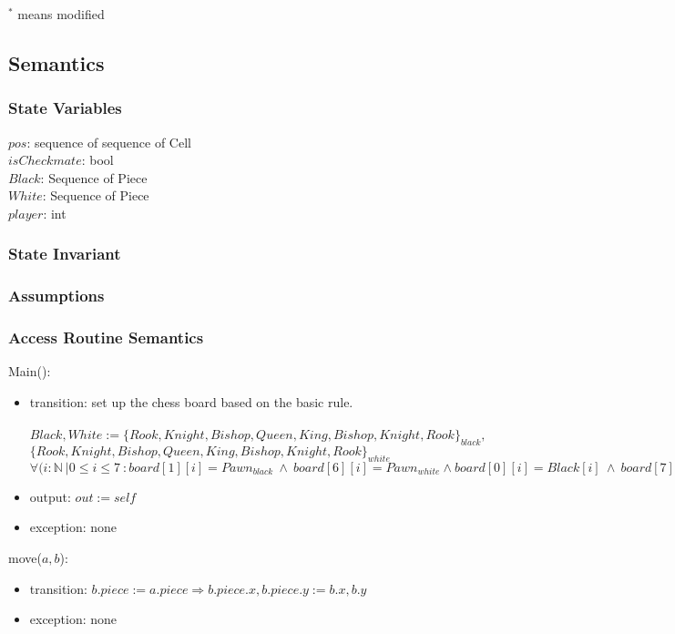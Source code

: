 \documentclass[12pt]{article}
\begin{document}
$^{*}$ means modified

\subsection* {Semantics}

\subsubsection* {State Variables}

$pos$: sequence of sequence of Cell\\
$isCheckmate$: bool\\
$Black$: Sequence of Piece\\
$White$: Sequence of Piece\\
$player$: int

\subsubsection* {State Invariant}

\subsubsection* {Assumptions}

\subsubsection* {Access Routine Semantics}

Main():
\begin{itemize}
\item transition: set up the chess board based on the basic rule. \\
\\
$Black, White := \{Rook, Knight, Bishop, Queen, King, Bishop, Knight, Rook\}_{black}, $\\
$\{Rook, Knight, Bishop, Queen, King, Bishop, Knight, Rook\}_{white}$\\
$\forall(i : \mathbb{N}\ | 0 \leq i \leq 7 \ : board[1][i] = Pawn_{black} \ \wedge \ board[6][i] = Pawn_{white} \wedge board[0][i] = Black[i] \ \wedge \ board[7][i] = White[i]$
\item output: $out := \mathit{self}$
\item exception: none
\end{itemize}

\noindent move($a, b$):
\begin{itemize}
\item transition: $b.piece := a.piece \Rightarrow b.piece.x , b.piece.y := b.x, b.y$
\item exception: none
\end{itemize}
\end{document}
